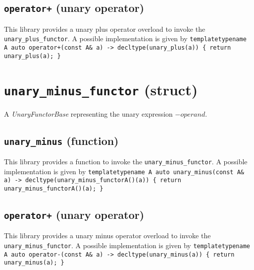 \documentclass[oneside]{book}
\begin{document}
\subsection{\texttt{operator+} (unary operator)}
This library provides a unary plus operator overload to invoke the \texttt{unary\_plus\_functor}.
A possible implementation is given by\newline
\texttt{template\textlangle typename A\textrangle\newline
auto operator+(const A\& a) -> decltype(unary\_plus(a))\newline
\{ return unary\_plus(a); \}}

\section{\texttt{unary\_minus\_functor} (struct)}
A \textit{UnaryFunctorBase} representing the unary expression $-\textit{operand}$.\newline

\subsection{\texttt{unary\_minus} (function)}
This library provides a function to invoke the \texttt{unary\_minus\_functor}.
A possible implementation is given by\newline
\texttt{template\textlangle typename A\textrangle\newline
auto unary\_minus(const A\& a) -> decltype(unary\_minus\_functor\textlangle A\textrangle()(a))\newline
\{ return unary\_minus\_functor\textlangle A\textrangle()(a); \}}

\subsection{\texttt{operator+} (unary operator)}
This library provides a unary minus operator overload to invoke the \texttt{unary\_minus\_functor}.
A possible implementation is given by\newline
\texttt{template\textlangle typename A\textrangle\newline
auto operator-(const A\& a) -> decltype(unary\_minus(a))\newline
\{ return unary\_minus(a); \}}





\end{document}
